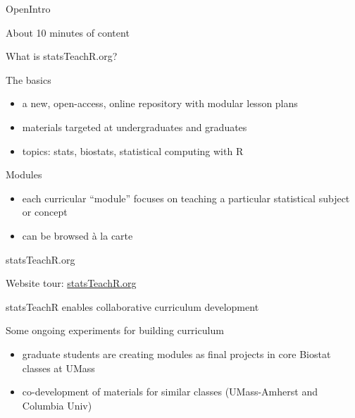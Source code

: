 

\begin{frame}{OpenIntro}

About 10 minutes of content

\end{frame}



\begin{frame}{What is statsTeachR.org?}

\begin{block}{The basics}
\begin{itemize}
        \item a new, open-access, online repository with modular lesson plans
        \item materials targeted at undergraduates and graduates 
        \item topics: stats, biostats, statistical computing with R
\end{itemize}
\end{block}

\begin{block}{Modules}
\begin{itemize}
        \item each curricular ``module'' focuses on teaching a particular statistical subject or concept
        \item can be browsed \`a la carte
\end{itemize}
\end{block}

\end{frame}


\begin{frame}{statsTeachR.org}

Website tour: \href{http://statsTeachR.org}{statsTeachR.org}

\end{frame}


\begin{frame}{statsTeachR enables collaborative curriculum development}

\begin{block}{Some ongoing experiments for building curriculum}
\begin{itemize}
        \item graduate students are creating modules as final projects in core Biostat classes at UMass
        \item co-development of materials for similar classes (UMass-Amherst and Columbia Univ) 
\end{itemize}
\end{block}


\end{frame}

